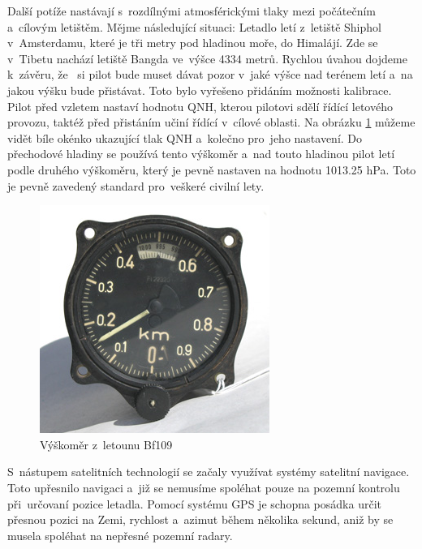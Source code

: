 		Další potíže nastávají s~rozdílnými atmosférickými tlaky mezi počátečním a~cílovým letištěm. Mějme následující situaci: Letadlo letí z~letiště Shiphol v~Amsterdamu, které je tři metry pod hladinou moře, do Himalájí. Zde se v~Tibetu nachází letiště Bangda ve~výšce 4334 metrů\cite{bangda}. Rychlou úvahou dojdeme k~závěru, že~ si pilot bude muset dávat pozor v~jaké výšce nad terénem letí a~na jakou výšku bude přistávat. Toto bylo vyřešeno přidáním možnosti kalibrace. Pilot před vzletem nastaví hodnotu QNH, kterou pilotovi sdělí řídící letového provozu, taktéž před přistáním učiní řídící v~cílové oblasti. Na obrázku \ref{historie::vyvojMereniVysky::109Altimeter} můžeme vidět bíle okénko ukazující tlak QNH a~kolečno pro~jeho nastavení. Do přechodové hladiny se používá tento výškoměr a~nad touto hladinou pilot letí podle druhého výškoměru, který je pevně nastaven na hodnotu 1013.25 hPa. Toto je pevně zavedený standard pro~veškeré civilní lety.\par
		
		\begin{figure}[H]
			\begin{center}
				\includegraphics[scale=0.75]{obrazky-figures/109Altimeter.jpg}
				\caption{Výškoměr z~letounu Bf109\protect\footnotemark}\label{historie::vyvojMereniVysky::109Altimeter}
			\end{center}
		\end{figure}
		
		S~nástupem satelitních technologií se začaly využívat systémy satelitní navigace. Toto upřesnilo navigaci a~již se nemusíme spoléhat pouze na pozemní kontrolu při~určovaní pozice letadla. Pomocí systému GPS je schopna posádka určit přesnou pozici na Zemi, rychlost a~azimut během několika sekund, aniž by se musela spoléhat na nepřesné pozemní radary.\par 
		
